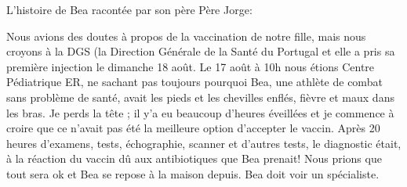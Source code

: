 L’histoire de Bea racontée par son père Père Jorge:

Nous avions des doutes à propos de la vaccination de notre fille, mais nous
croyons à la DGS (la Direction Générale de la Santé du Portugal et elle a pris
sa première injection le dimanche 18 août. Le 17 août à 10h nous étions Centre
Pédiatrique ER, ne sachant pas toujours pourquoi Bea, une athlète de combat sans
problème de santé, avait les pieds et les chevilles enflés, fièvre et maux dans
les bras. Je perds la tête ; il y’a eu beaucoup d’heures éveillées et je
commence à croire que ce n’avait pas été la meilleure option d’accepter le
vaccin. Après 20 heures d’examens, tests, échographie, scanner et d’autres
tests, le diagnostic était, à la réaction du vaccin dû aux antibiotiques que Bea
prenait! Nous prions que tout sera ok et Bea se repose à la maison depuis. Bea
doit voir un spécialiste.
